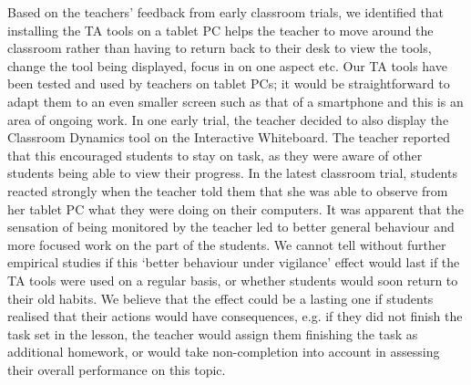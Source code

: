 Based on the teachers' feedback from early classroom trials, we
identified that installing the TA tools on a tablet PC 
helps the teacher to move around the classroom rather than
having to return back to their desk to view the tools, change the tool
being displayed, focus in on one aspect etc. 
Our TA tools have been tested and used by teachers on tablet PCs; it
would be straightforward to adapt them to an even smaller screen such
as that of a smartphone and this is an area of ongoing work.
In one early trial, the teacher decided to also display the 
Classroom Dynamics tool on the Interactive Whiteboard. The teacher
reported that this encouraged students to stay on task, as they were
aware of other students being able to view their progress. 
%
%
%
In the latest classroom trial, students reacted strongly when the teacher 
told them that she was able to observe from her tablet PC what they were 
doing on their computers. %
It was apparent that the sensation of being monitored by the teacher 
led to better general behaviour and more focused work on the part of 
the students. 
We cannot tell without further empirical studies if this 
`better behaviour under vigilance' effect 
would last if the TA tools were used on a regular basis, or whether
students would soon return to their old habits. 
We believe that the effect could be a lasting one if students realised that their
actions would have consequences, e.g. if they did not finish
the task set in the lesson, the teacher would assign them finishing the task
as additional homework, or would take non-completion into account in assessing
their overall performance on this topic. 

